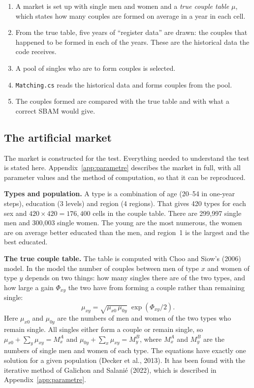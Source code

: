 \documentclass[12pt,a4paper]{article}
\newcommand{\kode}[1]{\texttt{#1}}
\begin{document}
\begin{enumerate}
\item A market is set up with single men and women and a \emph{true couple table} $\mu$, which
states how many couples are formed on average in a year in each cell.
\item From the true table, five years of ``register data'' are drawn: the couples that happened to
be formed in each of the years. These are the historical data the code receives.
\item A pool of singles who are to form couples is selected.
\item \kode{Matching.cs} reads the historical data and forms couples from the pool.
\item The couples formed are compared with the true table and with what a correct SBAM would give.
\end{enumerate}

\subsection{The artificial market}

The market is constructed for the test. Everything needed to understand the test is stated here.
Appendix~\ref{app:parametre} describes the market in full, with all parameter values and the
method of computation, so that it can be reproduced.

\textbf{Types and population.} A type is a combination of age (20--54 in one-year steps), education
(3 levels) and region (4 regions). That gives 420 types for each sex and $420\times420=176{,}400$
cells in the couple table. There are 299,997 single men and 300,003 single women. The young are the
most numerous, the women are on average better educated than the men, and region~1 is the largest
and the best educated.

\textbf{The true couple table.} The table is computed with Choo and Siow's (2006) model. In the
model the number of couples between men of type $x$ and women of type $y$
depends on two things: how many singles there are of the two types, and how large a gain
$\Phi_{xy}$ the two have from forming a couple rather than remaining single:
\[
\mu_{xy}=\sqrt{\mu_{x0}\,\mu_{0y}}\;\exp(\Phi_{xy}/2) .
\]
Here $\mu_{x0}$ and $\mu_{0y}$ are the numbers of men and women of the two types who remain single.
All singles either form a couple or remain single, so
$\mu_{x0}+\sum_y\mu_{xy}=M^A_x$ and $\mu_{0y}+\sum_x\mu_{xy}=M^B_y$, where $M^A_x$ and $M^B_y$ are
the numbers of single men and women of each type. The equations have exactly one solution for a
given population (Decker et al., 2013). It has been found with the iterative method of Galichon and
Salanié (2022), which is described in Appendix~\ref{app:parametre}.
\end{document}
